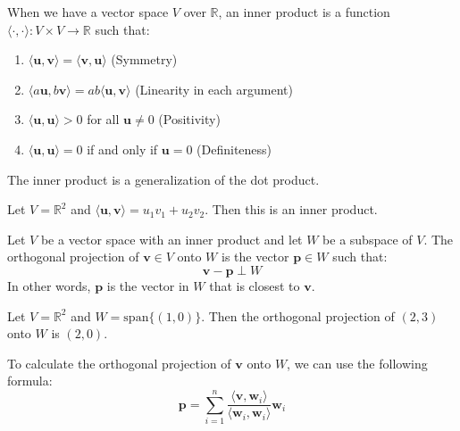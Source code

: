\begin{definition}
    When we have a vector space $V$ over $\mathbb{R}$, an inner product is a function $\langle \cdot, \cdot \rangle: V \times V \to \mathbb{R}$ such that:
    \begin{enumerate}
        \item $\langle \mathbf{u}, \mathbf{v} \rangle = \langle \mathbf{v}, \mathbf{u} \rangle$ (Symmetry)
        \item $\langle a\mathbf{u}, b\mathbf{v} \rangle = ab\langle \mathbf{u}, \mathbf{v} \rangle$ (Linearity in each argument)
        \item $\langle \mathbf{u}, \mathbf{u} \rangle > 0$ for all $\mathbf{u} \neq 0$ (Positivity)
        \item $\langle \mathbf{u}, \mathbf{u} \rangle = 0$ if and only if $\mathbf{u} = 0$ (Definiteness)
    \end{enumerate}
    The inner product is a generalization of the dot product.
    \begin{example}
        Let $V = \mathbb{R}^2$ and $\langle \mathbf{u}, \mathbf{v} \rangle = u_1v_1 + u_2v_2$. Then this is an inner product.
    \end{example}
\end{definition}
\begin{definition}
    Let $V$ be a vector space with an inner product and let $W$ be a subspace of $V$. The orthogonal projection of $\mathbf{v} \in V$ onto $W$ is the vector $\mathbf{p} \in W$ such that:
    \[
        \mathbf{v} - \mathbf{p} \perp W
    \]
    In other words, $\mathbf{p}$ is the vector in $W$ that is closest to $\mathbf{v}$.
    \begin{example}
        Let $V = \mathbb{R}^2$ and $W = \text{span}\{(1,0)\}$. Then the orthogonal projection of $(2,3)$ onto $W$ is $(2,0)$.
    \end{example}
    To calculate the orthogonal projection of $\mathbf{v}$ onto $W$, we can use the following formula:
    \[
        \mathbf{p} = \sum_{i=1}^n \frac{\langle \mathbf{v}, \mathbf{w}_i \rangle}{\langle \mathbf{w}_i, \mathbf{w}_i \rangle} \mathbf{w}_i
    \]
\end{definition}

